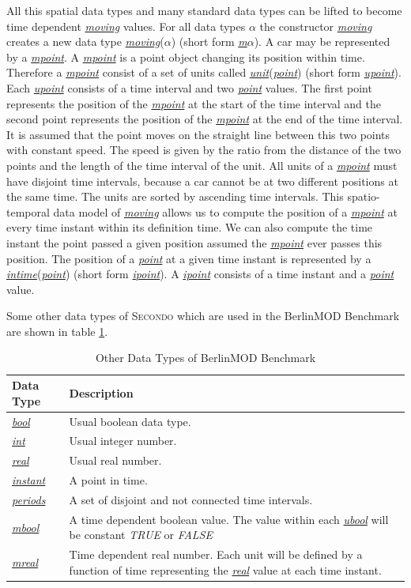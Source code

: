 \documentclass[a4paper]{article}
\newcommand{\secondo}{\textsc{Secondo}}
\newcommand{\bmodb} {BerlinMOD Benchmark}
\newcommand{\dt}[1]{\textsl{\underline{#1}}}
\newcommand{\true}{\textsl{TRUE}}
\newcommand{\false}{\textsl{FALSE}}
\begin{document}
All this spatial data types and many standard data types can be lifted to become
time dependent \dt{moving} values. For all data types \dt{$\alpha$} the constructor
\dt{moving} creates a new data type \dt{moving}(\dt{$\alpha$}) (short form \dt{m$\alpha$}).
A car may be represented by a \dt{mpoint}. A \dt{mpoint} is a point object changing
its position within time. Therefore a \dt{mpoint} consist of a set of units called
\dt{unit}(\dt{point}) (short form \dt{upoint}). Each \dt{upoint} consists of a time
interval and two \dt{point} values. The first point represents the position of the
\dt{mpoint} at the start of the time interval and the second point represents the
position of the \dt{mpoint} at the end of the time interval. It is assumed that
the point moves on the straight line between this two points with constant speed.
The speed is given by the ratio from the distance of the two points and the length
of the time interval of the unit. All units of a \dt{mpoint} must have disjoint
time intervals, because a car cannot be at two different positions at the same time.
The units are sorted by ascending time intervals. This spatio-temporal data model of \dt{moving} allows us to compute the position of a \dt{mpoint} at every time instant
within its definition time. We can also compute the time instant the point passed a
given position assumed the \dt{mpoint} ever passes this position. The position of a
\dt{point} at a given time instant is represented by a \dt{intime}(\dt{point}) (short form \dt{ipoint}). A \dt{ipoint} consists of a time instant and a \dt{point} value.

Some other data types of \secondo{} which are used in the \bmodb{} are shown in table \ref{tab:bmodbdatatypes}.
\begin{table}[H]
\begin{center}
\begin{scriptsize}
\begin{tabularx}{\textwidth}{|l|X|}
\hline
\textbf{Data Type} & \textbf{Description} \\
\hline
\dt{bool} & Usual boolean data type.\\
\hline
\dt{int} & Usual integer number.\\
\hline
\dt{real} & Usual real number.\\
\hline
\dt{instant} & A point in time.\\
\hline
\dt{periods} & A set of disjoint and not connected time intervals.\\
\hline
\dt{mbool} & A time dependent boolean value. The value within each \dt{ubool} will
 be constant \true{} or \false{} \\
\hline
\dt{mreal} & Time dependent real number. Each unit will be defined by a function
of time representing the \dt{real} value at each time instant.\\
\hline
\end{tabularx}
\end{scriptsize}
\caption{Other Data Types of \bmodb{}}
\label{tab:bmodbdatatypes}
\end{center}
\end{table}
\end{document}
